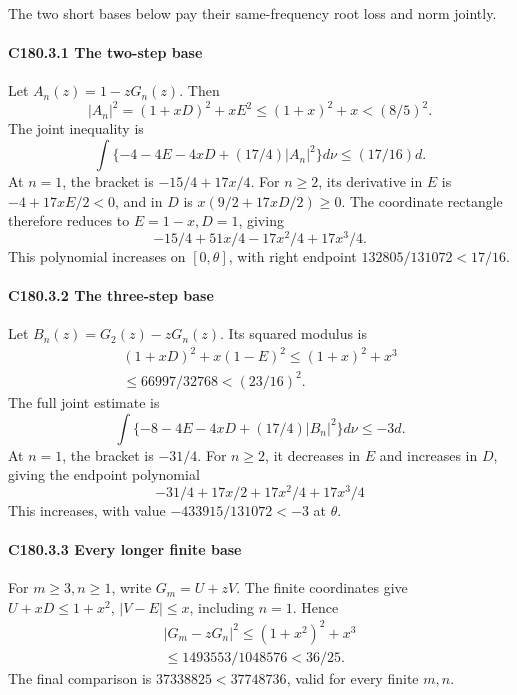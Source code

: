 The two short bases below pay their same-frequency root loss and norm jointly.

\paragraph{C180.3.1 The two-step base}

Let \(A_n(z)=1-zG_n(z).\) Then
\[
 |A_n|^2=(1+xD)^2+xE^2\le(1+x)^2+x<(8/5)^2.           \tag{C180.21}
\]
The joint inequality is
\[
 \int\{-4-4E-4xD+(17/4)|A_n|^2\}d\nu\le(17/16)d.  \tag{C180.22}
\]
At \(n=1\), the bracket is \(-15/4+17x/4\). For \(n\ge2\), its derivative in \(E\) is \(-4+17xE/2<0\), and in \(D\) is \(x(9/2+17xD/2)\ge0\). The coordinate rectangle therefore reduces to \(E=1-x,\allowbreak \allowbreak  D=1\), giving
\[
 -15/4+51x/4-17x^2/4+17x^3/4.
\]
This polynomial increases on \([0,\allowbreak \allowbreak  \theta]\), with right endpoint \(132805/131072<17/16\).

\paragraph{C180.3.2 The three-step base}

Let \(B_n(z)=G_2(z)-zG_n(z).\) Its squared modulus is
\[
\begin{gathered}
(1+xD)^2+x(1-E)^2\le(1+x)^2+x^3\\
\le66997/32768<(23/16)^2.
\end{gathered}\tag{C180.23}
\]
The full joint estimate is
\[
 \int\{-8-4E-4xD+(17/4)|B_n|^2\}d\nu\le-3d.        \tag{C180.24}
\]
At \(n=1\), the bracket is \(-31/4\). For \(n\ge2\), it decreases in \(E\) and increases in \(D\), giving the endpoint polynomial
\[
 -31/4+17x/2+17x^2/4+17x^3/4
\]
This increases, with value \(-433915/131072<-3\) at \(\theta\).

\paragraph{C180.3.3 Every longer finite base}

For \(m\ge3,\allowbreak \allowbreak  n\ge1\), write \(G_m=U+zV\). The finite coordinates give \(U+xD\le1+x^2\), \(|V-E|\le x\), including \(n=1\). Hence
\[
\begin{gathered}
|G_m-zG_n|^2\le(1+x^2)^2+x^3\\
\le1493553/1048576<36/25.
\end{gathered}\tag{C180.25}
\]
The final comparison is \(37338825<37748736\), valid for every finite \(m,\allowbreak \allowbreak  n\).

